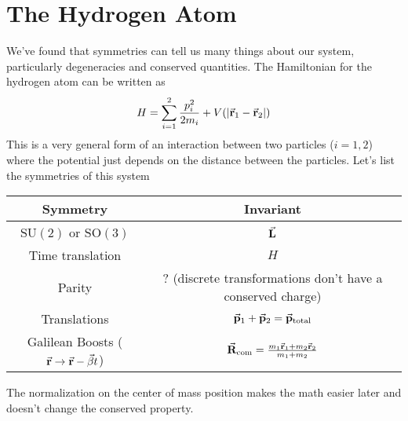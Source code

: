 \documentclass[a4paper,twoside,master.tex]{subfiles}
\begin{document}

\section{The Hydrogen Atom}
\label{sec:the_hydrogen_atom}

We've found that symmetries can tell us many things about our system, particularly degeneracies and conserved quantities. The Hamiltonian for the hydrogen atom can be written as
\begin{equation}
    H = \sum_{i=1}^{2} \frac{p_i^2}{2 m_i} + V(\abs{\va{r}_1 - \va{r}_2})
\end{equation}
This is a very general form of an interaction between two particles ($ i = 1, 2 $) where the potential just depends on the distance between the particles. Let's list the symmetries of this system

\begin{tabular}{@{}cc@{}} \toprule
    Symmetry & Invariant \\
    \midrule
    $\text{SU}(2)$ or $\text{SO}(3)$ & $ \va{L} $ \\
    Time translation & $ H $ \\
    Parity & ? (discrete transformations don't have a conserved charge) \\
    Translations & $ \va{p}_1 + \va{p}_2 = \va{p}_{\text{total}} $ \\
    Galilean Boosts ($ \va{r} \to \va{r} - \va{\beta} t $) & $ \va{R}_{\text{com}}  = \frac{m_1 \va{r}_1 + m_2 \va{r}_2}{m_1 + m_2} $ \\
    \bottomrule
\end{tabular}

The normalization on the center of mass position makes the math easier later and doesn't change the conserved property.
\end{document}

